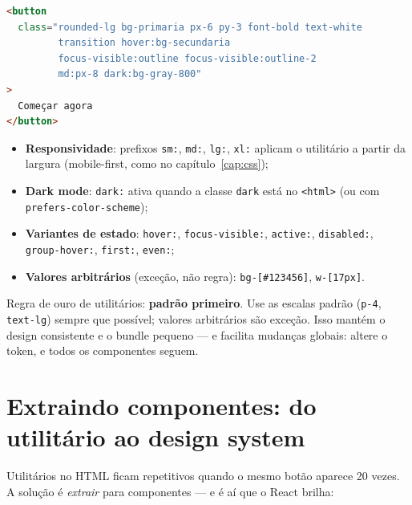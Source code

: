 \begin{lstlisting}[style=livro, language=HTML,
  caption={Composição com utilitários Tailwind.}, label={list:tailwind-uso}]
<button
  class="rounded-lg bg-primaria px-6 py-3 font-bold text-white
         transition hover:bg-secundaria
         focus-visible:outline focus-visible:outline-2
         md:px-8 dark:bg-gray-800"
>
  Começar agora
</button>
\end{lstlisting}

\begin{itemize}[leftmargin=*, itemsep=0.4em]
  \item \textbf{Responsividade}: prefixos \texttt{sm:}, \texttt{md:},
  \texttt{lg:}, \texttt{xl:} aplicam o utilitário a partir da largura
  (mobile-first, como no capítulo~\ref{cap:css});
  \item \textbf{Dark mode}: \texttt{dark:} ativa quando a classe \texttt{dark}
  está no \texttt{<html>} (ou com \texttt{prefers-color-scheme});
  \item \textbf{Variantes de estado}: \texttt{hover:}, \texttt{focus-visible:},
  \texttt{active:}, \texttt{disabled:}, \texttt{group-hover:}, \texttt{first:}, \texttt{even:};
  \item \textbf{Valores arbitrários} (exceção, não regra):
  \texttt{bg-[\#123456]}, \texttt{w-[17px]}.
\end{itemize}

\begin{caixadica}
Regra de ouro de utilitários: \textbf{padrão primeiro}. Use as escalas padrão
(\texttt{p-4}, \texttt{text-lg}) sempre que possível; valores arbitrários são
exceção. Isso mantém o design consistente e o bundle pequeno — e facilita
mudanças globais: altere o token, e todos os componentes seguem.
\end{caixadica}

\section{Extraindo componentes: do utilitário ao design system}

Utilitários no HTML ficam repetitivos quando o mesmo botão aparece 20 vezes.
A solução é \emph{extrair} para componentes — e é aí que o React brilha:

